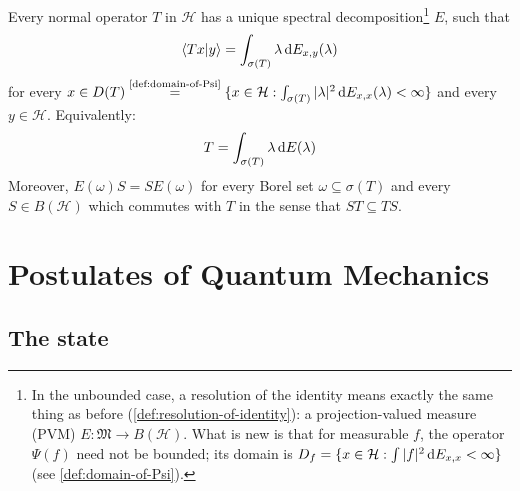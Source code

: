 \begin{theorem}\label{thm:spectral-theorem-unbounded}
Every normal operator $T$ in $\mathcal H$ has a unique spectral decomposition\footnote{%
In the unbounded case, a resolution of the identity means exactly the same thing as before (\autoref{def:resolution-of-identity}): a projection-valued measure (PVM)
\(
E:\mathfrak M\to B(\mathcal H)
\).
What is new is that for measurable \(f\), the operator
\(
\Psi(f)
\)
need not be bounded; its domain is
\(
D_f=\{x\in\mathcal H:\int |f|^2\,\mathrm{d} E_{x,x}<\infty\}
\)
(see \autoref{def:domain-of-Psi}).%
}  $E$, such that
\begin{equation}\label{eq:inner-product-spectral-representation}
\braket{Tx | y} = \int_{\sigma(T)} \lambda \,\mathrm{d} E_{x,y}(\lambda)
\end{equation}
for every $x \in D(T) \overset{\text{\ref{def:domain-of-Psi}}}{=} \{x\in\mathcal H:\int_{\sigma(T)} |\lambda|^2\,\mathrm{d} E_{x,x}(\lambda)<\infty\}$ and every $y \in \mathcal H$.
Equivalently:
\begin{equation}\label{eq:spectral-theorem-unbounded-operator}
T=\int_{\sigma(T)} \lambda\, \mathrm{d} E(\lambda)
\end{equation}
Moreover, $E(\omega) S = S E(\omega)$ for every Borel set $\omega \subseteq \sigma(T)$ and every $S \in B(\mathcal H)$ which commutes with $T$ in the sense that $ST \subseteq TS$.
\end{theorem}

















\clearpage

\section{Postulates of Quantum Mechanics} \label{sec:postulates-of-quantum-mechanics}




\subsection{The state}

